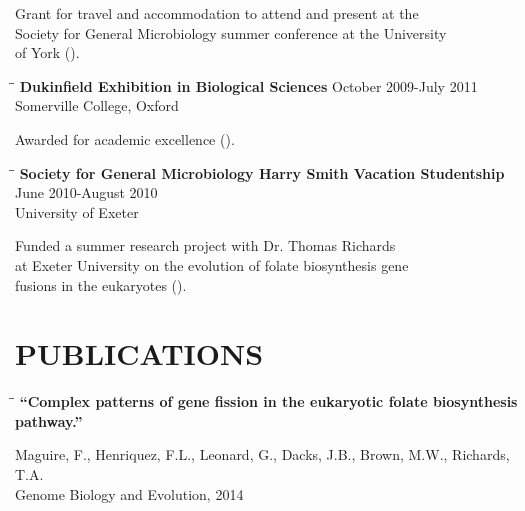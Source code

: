 \documentclass{res}
\begin{document}
\begin{resume}
\begin{tabbing}
   \end{tabbing}\vspace{-30pt}      
 Grant for travel and accommodation to attend and present at the\\ Society for General Microbiology summer conference at the University\\ of York (). 

 
   \begin{tabbing}
   \hspace{2in}\= \hspace{2.6in}\= \kill 
    {\bf Dukinfield Exhibition in Biological Sciences} \> \>        October 2009-July 2011\\
                                               
                                               \> \> Somerville College, Oxford \\
   \end{tabbing}\vspace{-30pt}     
   Awarded for academic excellence ().

\vspace{-0.1in}  
   \begin{tabbing}
   \hspace{2in}\= \hspace{2.6in}\= \kill 
    {\bf Society for General Microbiology Harry Smith Vacation Studentship} \> \>June 2010-August 2010\\
                            \> 
                            \> University of Exeter\\
   \end{tabbing}\vspace{-30pt}     
       Funded a summer research project with Dr. Thomas Richards \\
       at Exeter University on the evolution of folate biosynthesis gene \\
       fusions in the eukaryotes ().

\section{PUBLICATIONS} 
\vspace{-0.05in}
 \begin{tabbing}
   \hspace{2.3in}\= \hspace{2.6in}\= \kill
   {\bf ``Complex patterns of gene fission in the eukaryotic folate biosynthesis pathway.''\\
  }
   \end{tabbing}\vspace{-20pt}
   Maguire, F., Henriquez, F.L., Leonard, G., Dacks, J.B., Brown, M.W.,  Richards, T.A.\\
   Genome Biology and Evolution, 2014\\


\end{resume}
\end{document}
